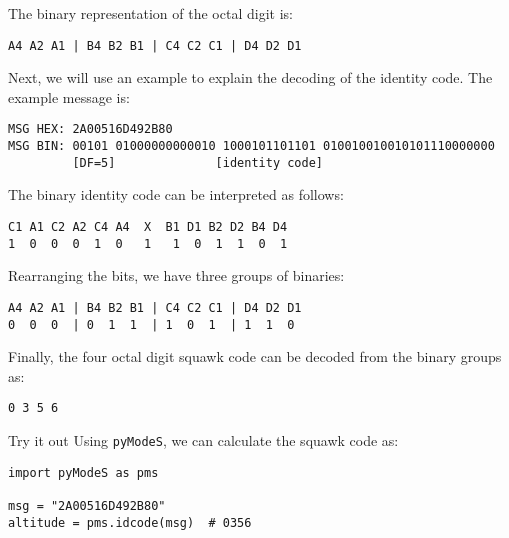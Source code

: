 The binary representation of the octal digit is:

\begin{verbatim}
A4 A2 A1 | B4 B2 B1 | C4 C2 C1 | D4 D2 D1
\end{verbatim}


Next, we will use an example to explain the decoding of the identity code. The example message is:

\begin{verbatim}
MSG HEX: 2A00516D492B80
MSG BIN: 00101 01000000000010 1000101101101 010010010010101110000000
         [DF=5]              [identity code]
\end{verbatim}

The binary identity code can be interpreted as follows:

\begin{verbatim}
C1 A1 C2 A2 C4 A4  X  B1 D1 B2 D2 B4 D4
1  0  0  0  1  0   1   1  0  1  1  0  1
\end{verbatim}

Rearranging the bits, we have three groups of binaries:
\begin{verbatim}
A4 A2 A1 | B4 B2 B1 | C4 C2 C1 | D4 D2 D1
0  0  0  | 0  1  1  | 1  0  1  | 1  1  0
\end{verbatim}

Finally, the four octal digit squawk code can be decoded from the binary groups as:
\begin{verbatim}
0 3 5 6
\end{verbatim}

\begin{notebox}{Try it out}
Using \texttt{pyModeS}, we can calculate the squawk code as: 

\begin{verbatim}
import pyModeS as pms

msg = "2A00516D492B80"
altitude = pms.idcode(msg)  # 0356
\end{verbatim}

\end{notebox}